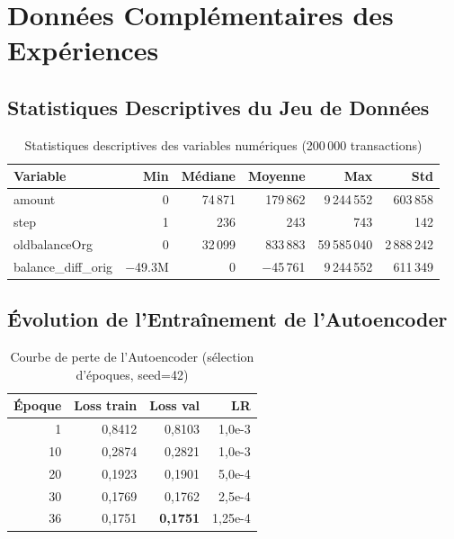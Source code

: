 \documentclass[12pt,a4paper,twoside]{report}
\theoremstyle{definition}
\begin{document}
\chapter{Données Complémentaires des Expériences}

\section{Statistiques Descriptives du Jeu de Données}

\begin{table}[H]
\centering
\caption{Statistiques descriptives des variables numériques (200\,000 transactions)}
\label{tab:stats_desc}
\renewcommand{\arraystretch}{1.3}
\begin{tabular}{lrrrrr}
\toprule
\textbf{Variable} & \textbf{Min} & \textbf{Médiane} & \textbf{Moyenne} & \textbf{Max} & \textbf{Std} \\
\midrule
amount & 0 & 74\,871 & 179\,862 & 9\,244\,552 & 603\,858 \\
step & 1 & 236 & 243 & 743 & 142 \\
oldbalanceOrg & 0 & 32\,099 & 833\,883 & 59\,585\,040 & 2\,888\,242 \\
balance\_diff\_orig & $-$49.3M & 0 & $-$45\,761 & 9\,244\,552 & 611\,349 \\
\bottomrule
\end{tabular}
\end{table}

\section{Évolution de l'Entraînement de l'Autoencoder}

\begin{table}[H]
\centering
\caption{Courbe de perte de l'Autoencoder (sélection d'époques, seed=42)}
\label{tab:ae_training}
\renewcommand{\arraystretch}{1.3}
\begin{tabular}{rrrr}
\toprule
\textbf{Époque} & \textbf{Loss train} & \textbf{Loss val} & \textbf{LR} \\
\midrule
1  & 0,8412 & 0,8103 & 1,0e-3 \\
10 & 0,2874 & 0,2821 & 1,0e-3 \\
20 & 0,1923 & 0,1901 & 5,0e-4 \\
30 & 0,1769 & 0,1762 & 2,5e-4 \\
36 & 0,1751 & \textbf{0,1751} & 1,25e-4 \\
\bottomrule
\end{tabular}
\end{table}
\end{document}
